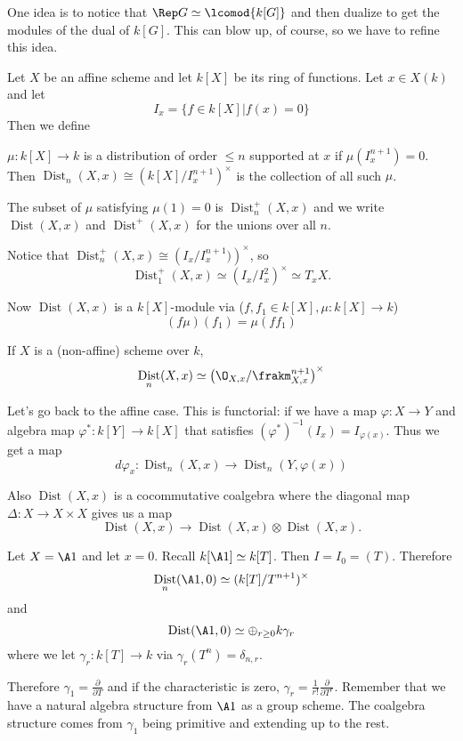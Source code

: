 \documentclass[12pt]{article}
\DeclareMathOperator{\Dist}{Dist}
\begin{document}
One idea is to notice that $\Rep G\simeq \lcomod{k[G]}$ and then dualize to get the modules of the dual of $k[G]$.
This can blow up, of course, so we have to refine this idea.

Let $X$ be an affine scheme and let $k[X]$ be its ring of functions. Let $x\in X(k)$ and let 
\[I_x=\{f\in k[X]|f(x)=0\}\]
Then we define 
\begin{defn}
	$\mu:k[X]\to k$ is a distribution of order $\le n$ supported at $x$ if $\mu(I_x^{n+1})=0$.
	Then $\operatorname{Dist}_n(X,x)\cong \left(k[X]/I_x^{n+1}\right)^\times$ is the collection of all such $\mu$.

	The subset of $\mu$ satisfying $\mu(1)=0$ is $\operatorname{Dist}_n^+(X,x)$ and we write $\operatorname{Dist}(X,x)$ and $\operatorname{Dist}^+(X,x)$
	for the unions over all $n$.
\end{defn}
Notice that $\Dist^+_n(X,x)\cong \left(I_x/I_x^{n+1})\right)^\times$, so 
\[\Dist_1^+(X,x)\simeq (I_x/I_x^2)^\times\simeq T_xX.\]

Now $\Dist(X,x)$ is a $k[X]$-module via ($f,f_1\in k[X],\mu:k[X]\to k$)
\[(f\mu)(f_1)=\mu(ff_1)\]
\begin{rmk}
	If $X$ is a (non-affine) scheme over $k$,
	\[\Dist_n(X,x)\simeq \left(\O_{X,x}/\frakm_{X,x}^{n+1}\right)^\times\]
\end{rmk}
Let's go back to the affine case. This is functorial: if we have a map $\varphi:X\to Y$ and algebra map 
$\varphi^\ast:k[Y]\to k[X]$ that satisfies $(\varphi^\ast)^{-1}(I_x)=I_{\varphi(x)}$. Thus we get a map 
\[d\varphi_x:\Dist_n(X,x)\to \Dist_n(Y,\varphi(x))\]

Also $\Dist(X,x)$ is a cocommutative coalgebra where the diagonal map $\Delta:X\to X\times X$ gives us a map 
\[\Dist(X,x)\to \Dist(X,x)\otimes \Dist(X,x).\]

\begin{ex}
	Let $X=\A1$ and let $x=0$. Recall $k[\A1]\simeq k[T]$. Then $I=I_0=(T)$.
	Therefore 
	\[\Dist_n(\A1,0)\simeq (k[T]/T^{n+1})^\times\]
	and 
	\[\Dist(\A1,0)\simeq \oplus_{r\ge 0}k\gamma_r\]
	where we let $\gamma_r:k[T]\to k$ via $\gamma_r(T^n)=\delta_{n,r}$.

	Therefore $\gamma_1=\frac{\partial}{\partial T}$ and if the characteristic is zero, $\gamma_r=\frac{1}{r!}\frac{\partial}{\partial T^r}$.
	Remember that we have a natural algebra structure from $\A1$ as a group scheme. The coalgebra structure comes from $\gamma_1$ 
	being primitive and extending up to the rest.
\end{ex}
\end{document}
